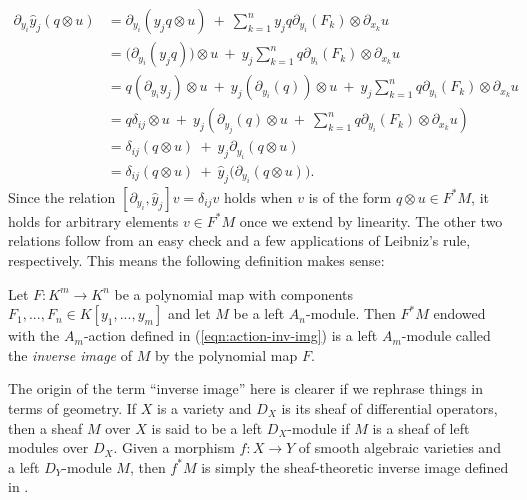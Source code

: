 \begin{align*}
	\partial_{y_i}\hat{y}_j(q\otimes u)
	  &= \partial_{y_i}(y_j q \otimes u) ~+~ \sum_{k=1}^n y_jq\partial_{y_i}(F_k) \otimes \partial_{x_k}u \\
	  &= \big(\partial_{y_i}(y_j q)\big)\otimes u ~+~ y_j \sum_{k=1}^n q \partial_{y_i}(F_k) \otimes \partial_{x_k}u \\
	  &= q(\partial_{y_i}y_j)\otimes u ~+~ y_j(\partial_{y_i}(q))\otimes u ~+~ y_j \sum_{k=1}^n q \partial_{y_i}(F_k) \otimes \partial_{x_k}u \\
	  &= q\delta_{ij} \otimes u ~+~ y_j\left(\partial_{y_j}(q) \otimes u ~+~ \sum_{k=1}^n q\partial_{y_i}(F_k) \otimes \partial_{x_k}u\right) \\
	  &= \delta_{ij}(q\otimes u) ~+~ y_j\partial_{y_i}(q\otimes u) \\
	  &= \delta_{ij}(q\otimes u) ~+~ \hat{y}_j\big(\partial_{y_i}(q\otimes u)\big).
\end{align*}
Since the relation $[\partial_{y_i},\hat{y}_j]v = \delta_{ij}v$ holds when $v$ is of the form $q\otimes u \in F^*M$, it holds for arbitrary elements $v\in F^*M$ once we extend by linearity. The other two relations follow from an easy check and a few applications of Leibniz's rule, respectively.  This means the following definition makes sense:

\begin{defn}\label{defn:inv-img}
	Let $F:K^m\to K^n$ be a polynomial map with components $F_1,...,F_n \in K[y_1,...,y_m]$ and let $M$ be a left $A_n$-module. Then $F^*M$ endowed with the $A_m$-action defined in (\ref{eqn:action-inv-img}) is a left $A_m$-module called the \emph{inverse image} of $M$ by the polynomial map $F$.
\end{defn}

\begin{rmk}\label{rmk:inv-img}
	The origin of the term ``inverse image'' here is clearer if we rephrase things in terms of geometry. If $X$ is a variety and $D_X$ is its sheaf of differential operators, then a sheaf $M$ over $X$ is said to be a left $D_X$-module if $M$ is a sheaf of left modules over $D_X$. Given a morphism $f:X\to Y$ of smooth algebraic varieties and a left $D_Y$-module $M$, then $f^*M$ is simply the sheaf-theoretic inverse image defined in \cite{hartshorne}.
\end{rmk}

